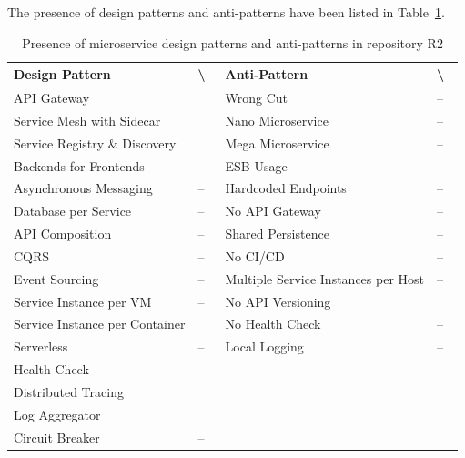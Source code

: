 \documentclass{Configuration_Files/PoliMi3i_thesis}
\newcommand{\cmark}{\ding{51}}%
\begin{document}
The presence of design patterns and anti-patterns have been listed in Table~\ref{table:R2_result}.

\begin{table}[H]
\centering 
    \begin{tabular}{ 
  | >{\centering\arraybackslash} m{16em} 
  | >{\centering\arraybackslash} m{2.2em} 
  | >{\centering\arraybackslash} m{16em} 
  | >{\centering\arraybackslash} m{2.2em} | }
    \hline
    \rowcolor{bluepoli!40}
    \textbf{Design Pattern} & \cmark \textbackslash – & \textbf{Anti-Pattern} & \cmark \textbackslash – \T\B \\
    \hline \hline
    API Gateway & \cmark & Wrong Cut & – \T\B\\
    \hline
    \rowcolor{bluepoli!10}
    Service Mesh with Sidecar & \cmark & Nano Microservice & – \T\B \\
    \hline
    Service Registry \& Discovery & \cmark & Mega Microservice & – \T\B \\
    \hline
    \rowcolor{bluepoli!10}
    Backends for Frontends & – & ESB Usage & – \T\B \\
    \hline
    Asynchronous Messaging & – & Hardcoded Endpoints & – \T\B \\
    \hline
    \rowcolor{bluepoli!10}
    Database per Service & – & No API Gateway & – \T\B \\
    \hline
    API Composition & – & Shared Persistence & – \T\B \\
    \hline
    \rowcolor{bluepoli!10}
    CQRS & – & No CI/CD & – \T\B \\
    \hline
    Event Sourcing & – & Multiple Service Instances per Host & – \T\B \\
    \hline
    \rowcolor{bluepoli!10}
    Service Instance per VM & – & No API Versioning & \cmark \T\B \\
    \hline
    Service Instance per Container & \cmark & No Health Check & – \T\B \\
    \hline
    \rowcolor{bluepoli!10}
    Serverless & – & Local Logging & – \T\B \\
    \hline
    Health Check & \cmark &  & \T\B \\
    \hline
    \rowcolor{bluepoli!10}
    Distributed Tracing & \cmark & & \T\B \\
    \hline
    Log Aggregator & \cmark &  & \T\B \\
    \hline
    \rowcolor{bluepoli!10}
    Circuit Breaker & – &  & \T\B \\
    \hline
    \end{tabular}
    \\[10pt]
    \caption{Presence of microservice design patterns and anti-patterns in repository R2}
    \label{table:R2_result}
\end{table}
\end{document}

